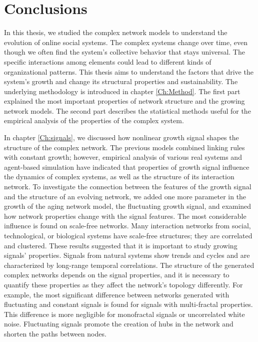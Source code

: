 \chapter{Conclusions} %
\label{Ch:Conclussion}

In this thesis, we studied the complex network models to understand the evolution of online social systems. %
The complex systems change over time, even though we often find the system's collective behavior that stays universal. The specific interactions among elements could lead to different kinds of organizational patterns. This thesis aims to understand the factors that drive the system's growth and change its structural properties and sustainability.
The underlying methodology is introduced in chapter \ref{Ch:Method}. The first part explained the most important properties of network structure and the growing network models. The second part describes the statistical methods useful for the empirical analysis of the properties of the complex system.  

In chapter \ref{Ch:signals}, we discussed how nonlinear growth signal shapes the structure of the complex network. 
The previous models combined linking rules with constant growth; however, empirical analysis of various real systems and agent-based simulation \cite{mitrovic2012, mitrovic2015} have indicated that properties of growth signal influence the dynamics of complex systems, as well as the structure of its interaction network. To investigate the connection between the features of the growth signal and the structure of an evolving network, we added one more parameter in the growth of the aging network model, the fluctuating growth signal, and examined how network properties change with the signal features.
The most considerable influence is found on scale-free networks. Many interaction networks from social, technological, or biological systems have scale-free structures; they are correlated and clustered. These results suggested that it is important to study growing signals' properties. Signals from natural systems show trends and cycles and are characterized by long-range temporal correlations. The structure of the generated complex networks depends on the signal properties, and it is necessary to quantify these properties as they affect the network's topology differently. For example, the most significant difference between networks generated with fluctuating and constant signals is found for signals with multi-fractal properties. This difference is more negligible for monofractal signals or uncorrelated white noise. Fluctuating signals promote the creation of hubs in the network and shorten the paths between nodes.

